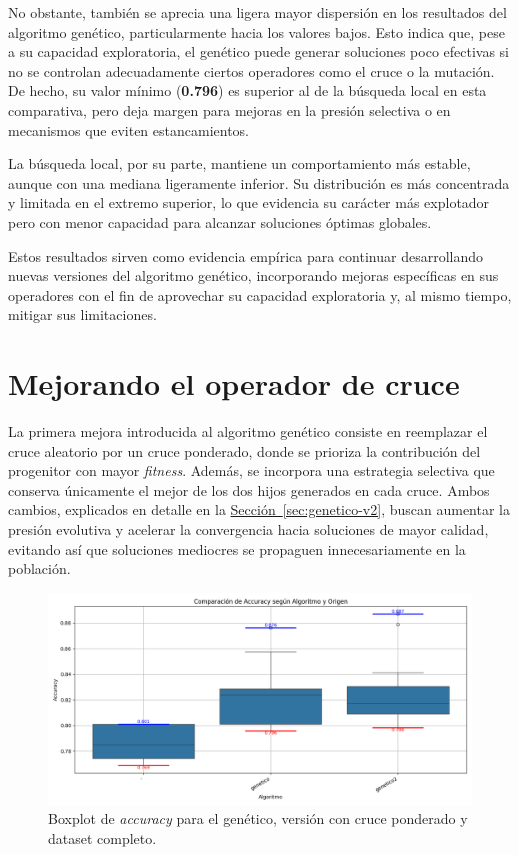 No obstante, también se aprecia una ligera mayor dispersión en los resultados del algoritmo genético, particularmente hacia los valores bajos.
Esto indica que, pese a su capacidad exploratoria, el genético puede generar soluciones poco efectivas si no se controlan adecuadamente ciertos operadores como el cruce o la mutación.
De hecho, su valor mínimo (\textbf{0.796}) es superior al de la búsqueda local en esta comparativa,
pero deja margen para mejoras en la presión selectiva o en mecanismos que eviten estancamientos.

La búsqueda local, por su parte, mantiene un comportamiento más estable, aunque con una mediana ligeramente inferior.
Su distribución es más concentrada y limitada en el extremo superior, lo que evidencia su carácter más explotador pero con menor capacidad para alcanzar soluciones óptimas globales.

Estos resultados sirven como evidencia empírica para continuar desarrollando nuevas versiones del algoritmo genético,
incorporando mejoras específicas en sus operadores con el fin de aprovechar su capacidad exploratoria y, al mismo tiempo, mitigar sus limitaciones.

\section{Mejorando el operador de cruce}\label{sec:incorporacion-cruce}
La primera mejora introducida al algoritmo genético consiste en reemplazar el cruce aleatorio por un cruce ponderado,
donde se prioriza la contribución del progenitor con mayor \textit{fitness}.
Además, se incorpora una estrategia selectiva que conserva únicamente el mejor de los dos hijos generados en cada cruce.
Ambos cambios, explicados en detalle en la \hyperref[sec:genetico-v2]{Sección~\ref*{sec:genetico-v2}},
buscan aumentar la presión evolutiva y acelerar la convergencia hacia soluciones de mayor calidad,
evitando así que soluciones mediocres se propaguen innecesariamente en la población.

\begin{figure}[htp]
    \centering
    \includegraphics[width=1\textwidth]{imagenes/evaluaciones/operador-de-cruce}
    \caption{Boxplot de \textit{accuracy} para el genético, versión con cruce ponderado y dataset completo.}
    \label{fig:cruce_ponderado}
\end{figure}


